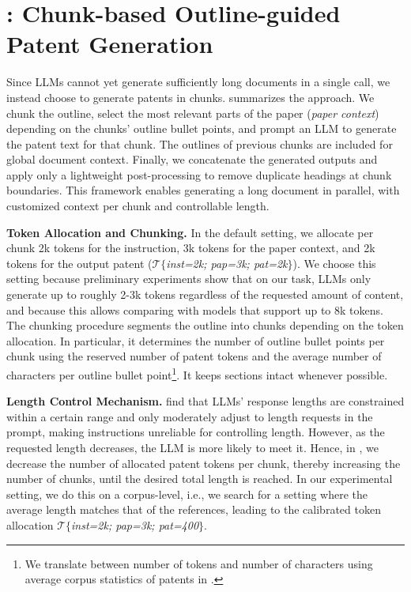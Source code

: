 \section{\MethodName: Chunk-based Outline-guided Patent Generation}

Since LLMs cannot yet generate sufficiently long documents in a single call, we instead choose to generate patents in chunks. 
 summarizes the approach.
We chunk the outline, select the most relevant parts of the paper (\textit{paper context})
depending on the chunks' outline bullet points, and prompt an LLM to generate the patent text for that chunk.
The outlines of previous chunks are included for global document context.
Finally, we concatenate the generated outputs and apply only a lightweight post-processing to remove duplicate headings at chunk boundaries.
This framework enables generating a long document in parallel, with customized context per chunk and controllable length.




\noindent\textbf{Token Allocation and Chunking. } 
In the default setting, we allocate per chunk 2k tokens for the instruction, 3k tokens for the paper context, and 2k tokens for the output patent ($\mathcal{T}$\textit{$\{$inst=2k; pap=3k; pat=2k$\}$}).
We choose this setting because preliminary experiments show that on our task, LLMs only generate up to roughly 2-3k tokens regardless of the requested amount of content,
and because this allows comparing with models that support up to 8k tokens.
The chunking procedure segments the outline into chunks depending on the token allocation.
In particular, it determines the number of outline bullet points per chunk using the reserved number of patent tokens and the average number of characters per outline bullet point\footnote{We translate between number of tokens and number of characters using average corpus statistics of patents in \DatasetName.}.
It keeps sections intact whenever possible.

\noindent\textbf{Length Control Mechanism. }
\citet{baiLongWriterUnleashing102024} find that LLMs' response lengths are constrained within a certain range and only moderately adjust to length requests in the prompt, making instructions unreliable for controlling length. 
However, as the requested length decreases, the LLM is more likely to meet it.
Hence, in \MethodName, we decrease the number of allocated patent tokens per chunk, thereby increasing the number of chunks, until the desired total length is reached.
In our experimental setting, we do this on a corpus-level, i.e., we search for a setting where the average length matches that of the references, leading to the calibrated token allocation $\mathcal{T}$\textit{$\{$inst=2k; pap=3k; pat=400$\}$}.


